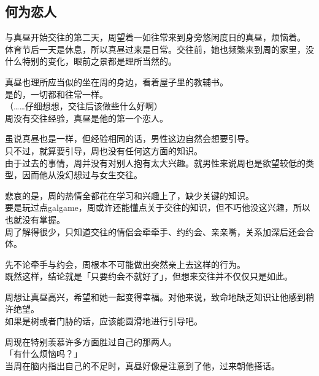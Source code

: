 \subsection{何为恋人}

与真昼开始交往的第二天，周望着一如往常来到身旁悠闲度日的真昼，烦恼着。\\

体育节后一天是休息，所以真昼过来是日常。交往前，她也频繁来到周的家里，没什么特别的变化，眼前之景都是理所当然的。

真昼也理所应当似的坐在周的身边，看着屋子里的教辅书。\\

是的，一切都和往常一样。\\

（……仔细想想，交往后该做些什么好啊）\\

周没有交往经验，真昼是他的第一个恋人。

虽说真昼也是一样，但经验相同的话，男性这边自然会想要引导。\\

只不过，就算要引导，周也没有任何这方面的知识。\\

由于过去的事情，周并没有对别人抱有太大兴趣。就男性来说周也是欲望较低的类型，因而他从没幻想过与女生交往。

悲哀的是，周的热情全都花在学习和兴趣上了，缺少关键的知识。\\

要是玩过点galgame，周或许还能懂点关于交往的知识，但不巧他没这兴趣，所以也就没有掌握。\\

周了解得很少，只知道交往的情侣会牵牵手、约约会、亲亲嘴，关系加深后还会合体。

先不论牵手与约会，周根本不可能做出突然亲上去这样的行为。\\

既然这样，结论就是「只要约会不就好了」，但想来交往并不仅仅只是如此。

周想让真昼高兴，希望和她一起变得幸福。对他来说，致命地缺乏知识让他感到稍许绝望。\\

如果是树或者门胁的话，应该能圆滑地进行引导吧。

周现在特别羡慕许多方面胜过自己的那两人。\\

「有什么烦恼吗？」\\

当周在脑内指出自己的不足时，真昼好像是注意到了他，过来朝他搭话。\\

